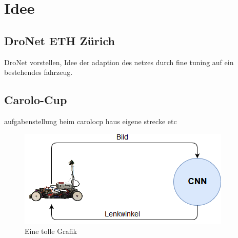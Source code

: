%
\chapter{Idee}

\section{DroNet ETH Zürich}
DroNet vorstellen, Idee der adaption des netzes durch fine tuning auf ein bestehendes fahrzeug.

\section{Carolo-Cup}

aufgabenstellung beim carolocp
haus eigene strecke etc

\begin{figure}
	\centering
	\includegraphics[scale=0.7]{figures/Aufbau.png}
	\caption{Eine tolle Grafik}
	\label{img:toll ist das}
\end{figure}

